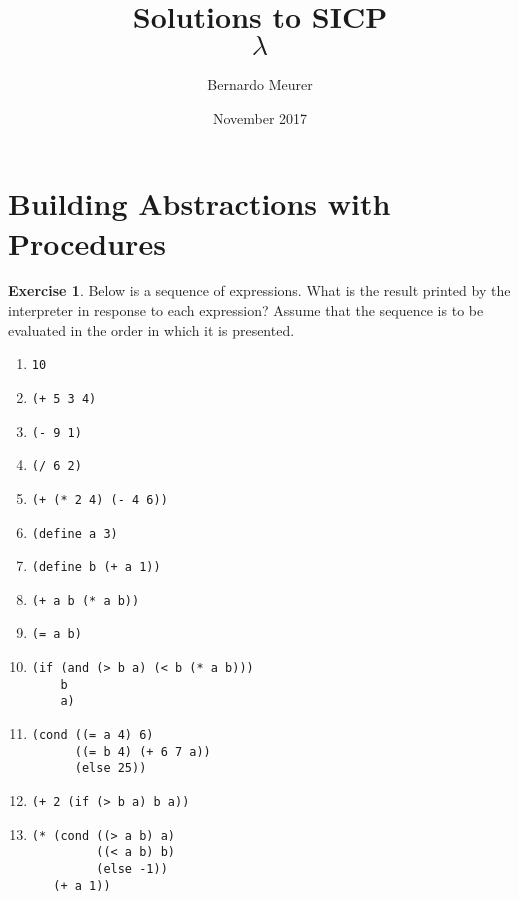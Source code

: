 \documentclass[11pt]{article}
\title{Solutions to SICP
    \vfill
    {\fontsize{80}{0}\selectfont \[\lambda \]}
    \vfill}
\date{November 2017}
\author{Bernardo Meurer}
\theoremstyle{definition}
\newcommand{\inline}{\texttt}
\newtheorem{exe}{Exercise}[section]
\begin{document}
\maketitle
\newpage
\section{Building Abstractions with Procedures}
\begin{exe}
    Below is a sequence of expressions. What is the result printed by the interpreter in response to each expression? Assume that the sequence is to be evaluated in the order in which it is presented.
    \begin{enumerate}[label=\alph*.]
        \item \inline{10}
        \item \inline{(+ 5 3 4)}
        \item \inline{(- 9 1)}
        \item \inline{(/ 6 2)}
        \item \inline{(+ (* 2 4) (- 4 6))}
        \item \inline{(define a 3)}
        \item \inline{(define b (+ a 1))}
        \item \inline{(+ a b (* a b))}
        \item \inline{(= a b)}
        \item \begin{verbatim}
(if (and (> b a) (< b (* a b)))
    b
    a)
        \end{verbatim}
        \item \begin{verbatim}
(cond ((= a 4) 6)
      ((= b 4) (+ 6 7 a))
      (else 25))
        \end{verbatim}


        \item \inline{(+ 2 (if (> b a) b a))}
        \item \begin{verbatim}
(* (cond ((> a b) a)
         ((< a b) b)
         (else -1))
   (+ a 1))
        \end{verbatim}
    \end{enumerate}
\end{exe}
\end{document}
